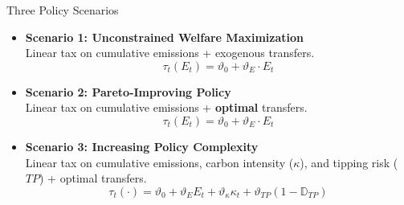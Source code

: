 \documentclass[aspectratio=1610]{beamer}
\begin{document}
\begin{frame}{Three Policy Scenarios}
    \begin{itemize}
        \setlength\itemsep{1.2em}
        
        \item \textbf{Scenario 1: Unconstrained Welfare Maximization} \\
        \small{Linear tax on cumulative emissions + exogenous transfers.}
        \begin{equation*}
            \tau_t(E_t) = \vartheta_0 + \vartheta_E \cdot E_t
        \end{equation*}
        
        \item \textbf{Scenario 2: Pareto-Improving Policy} \\
        \small{Linear tax on cumulative emissions + \textbf{optimal} transfers.}
        \begin{equation*}
             \tau_t(E_t) = \vartheta_0 + \vartheta_E \cdot E_t
        \end{equation*}
        
        \item \textbf{Scenario 3: Increasing Policy Complexity} \\
        \small{Linear tax on cumulative emissions, carbon intensity ($\kappa$), and tipping risk ($TP$) + optimal transfers.}
        \begin{equation*}
            \tau_t(\cdot) = \vartheta_0 + \vartheta_E E_t + \vartheta_\kappa \kappa_t + \vartheta_{TP} (1-\mathbb{D}_{TP})
        \end{equation*}
    \end{itemize}
\end{frame}

\end{document}
